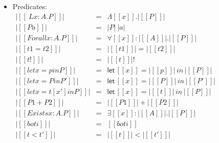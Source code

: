 \documentclass[phd,appendix,dedicationpage,ackpage,epigraphpage]{uithesis}
\begin{document}
\begin{definition}
\begin{itemize}
  \item Predicates:\\
    \begin{math}
      \begin{array}{lll}
        |[[\ L x : A . P]]|       & = & \Lambda [[x]] . |[[P]]|\\
        |[[P a]]|                 & = & |P|\ |a|\\
        |[[Forall x : A . P]]|    & = & \forall [[x]]:|[[A]]|.|[[P]]|\\
        |[[t1 = t2]]|             & = & |[[t1]]| = |[[t2]]|\\
        |[[t !]]|                 & = & |[[t]]|!\\
        |[[let x = p in P]]|      & = & \mathsf{let}\,[[x]] = |[[p]]|\,in\,|[[P]]|\\
        |[[let x = P in P']]|     & = & \mathsf{let}\,[[x]] = |[[P]]|\,in\,|[[P']]|\\
        |[[let x = t [x'] in P]]| & = & \mathsf{let}\,[[x]] = |[[t]]|\,in\,|[[P]]|\\
        |[[P1 + P2]]|             & = & |[[P1]]| + |[[P2]]|\\
        |[[Exists x : A . P]]|    & = & \exists [[x]]:|[[A]]|.|[[P]]|\\
        |[[bot i]]|               & = & [[bot i]]\\
        |[[t < t']]|              & = & |[[t]]| < |[[t']]|
      \end{array}
    \end{math}
    

\end{itemize}
\end{definition}
\end{document}
